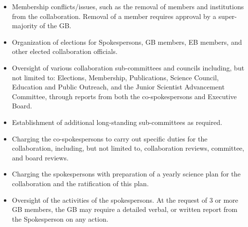 \documentclass[12pt]{article}
\newcommand{\Comment}[1]{\textcolor{Blue}{(Comment: #1)}}
\begin{document}
\begin{itemize}
\item Membership conflicts/issues, such as the removal of members and institutions from the collaboration. Removal of a member requires approval by a super-majority of the GB.
\item Organization of elections for Spokespersons, GB members, EB members, and other elected collaboration officials.
\item Oversight of various collaboration sub-committees and councils including, but not limited to: Elections, Membership, Publications, Science Council, Education and Public Outreach, and the Junior Scientist Advancement Committee, through reports from both the co-spokespersons and Executive Board.
\item Establishment of additional long-standing sub-committees as required. 
\item Charging the co-spokespersons to carry out specific duties for the collaboration, including, but not limited to, collaboration reviews, committee, and board reviews. 
\item Charging the spokespersons with preparation of a yearly science plan for the collaboration and the ratification of this plan.  
\item Oversight of the activities of the spokespersons. At the request of 3 or more GB members, the GB may require a detailed verbal, or written report from the Spokesperson on any action. %
\end{itemize}
\end{document}
